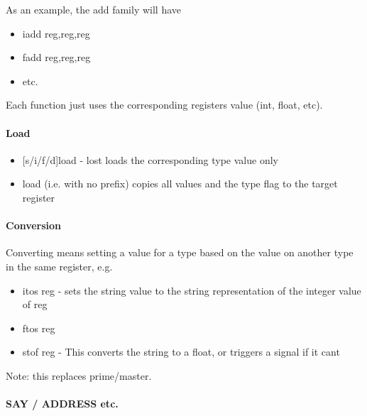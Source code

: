 As an example, the add family will have

\begin{itemize}
\item iadd reg,reg,reg

\item fadd reg,reg,reg

\item etc.

\end{itemize}

Each function just uses the corresponding registers value (int, float, etc).

\paragraph{Load}

\begin{itemize}
\item {[}s/i/f/d{]}load - lost loads the corresponding type value only

\item load (i.e. with no prefix) copies all values and the type flag to the target register

\end{itemize}

\paragraph{Conversion}

Converting means setting a value for a type based on the value on another type in the same register, e.g.

\begin{itemize}
\item itos reg - sets the string value to the string representation of the integer value of reg

\item ftos reg

\item stof reg - This converts the string to a float, or triggers a signal if it can\textquotesingle{}t

\end{itemize}

Note: this replaces prime/master.

\paragraph{SAY / ADDRESS etc.}

